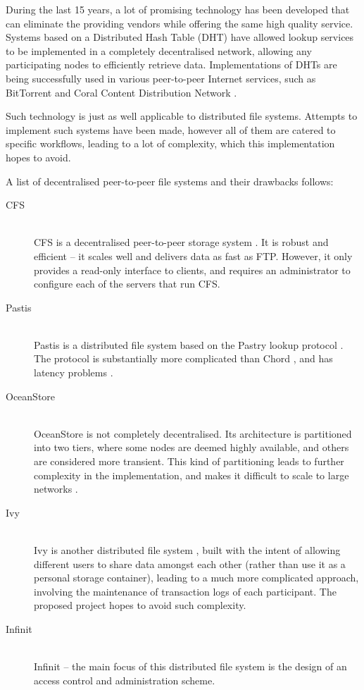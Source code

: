 \documentclass[8pt,a4paper]{article}
\begin{document}
During the last 15 years, a lot of promising technology has been developed that can eliminate the providing vendors while offering the same high quality service. 
Systems based on a Distributed Hash Table (DHT) have allowed lookup services to be implemented in a completely decentralised network, allowing any participating nodes to efficiently retrieve data. Implementations of DHTs are being successfully used in various peer-to-peer Internet services, such as BitTorrent and Coral Content Distribution Network \cite{coral}.

Such technology is just as well applicable to distributed file systems. Attempts to implement such systems have been made, however all of them are catered to specific workflows, leading to a lot of complexity, which this implementation hopes to avoid.

A list of decentralised peer-to-peer file systems and their drawbacks follows:

\begin{description}
  \item[CFS] \hfill \\ 
  CFS is a decentralised peer-to-peer storage system \cite{cfs}. It is robust and efficient -- it scales well and delivers data as fast as FTP. However, it only provides a read-only interface to clients, and requires an administrator to configure each of the servers that run CFS.
  \item[Pastis] \hfill \\
  Pastis is a distributed file system based on the Pastry lookup protocol \cite{pastis}. The protocol is substantially more complicated than Chord \cite{chord}, and has latency problems \cite{chordalt}.
  \item[OceanStore] \hfill \\
  OceanStore \cite{oceanstore} is not completely decentralised. Its architecture is partitioned into two tiers, where some nodes are deemed highly available, and others are considered more transient. This kind of partitioning leads to further complexity in the implementation, and makes it difficult to scale to large networks \cite{towards}.
  \item[Ivy] \hfill \\
  Ivy is another distributed file system \cite{ivy}, built with the intent of allowing different users to share data amongst each other (rather than use it as a personal storage container), leading to a much more complicated approach, involving the maintenance of transaction logs of each participant. The proposed project hopes to avoid such complexity.
  \item[Infinit] \hfill \\ 
  Infinit \cite{towards} -- the main focus of this distributed file system is the design of an access control and administration scheme. 
\end{description}
\end{document}
